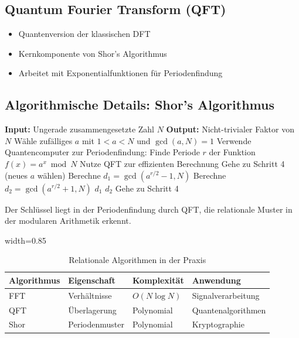 	\subsection{Quantum Fourier Transform (QFT)}
	
	\begin{itemize}
		\item Quantenversion der klassischen DFT
		\item Kernkomponente von Shor's Algorithmus
		\item Arbeitet mit Exponentialfunktionen für Periodenfindung
	\end{itemize}
	
	\subsection{Algorithmische Details: Shor's Algorithmus}
	
	\begin{algorithm}[H]
\scriptsize
		\caption{Shor's Algorithmus für Primfaktorisierung}
		\label{alg:shor}
		\begin{algorithmic}[1]
			\STATE \textbf{Input:} Ungerade zusammengesetzte Zahl $N$
			\STATE \textbf{Output:} Nicht-trivialer Faktor von $N$
			\STATE 
			\STATE Wähle zufälliges $a$ mit $1 < a < N$ und $\gcd(a,N) = 1$
			\STATE Verwende Quantencomputer zur Periodenfindung:
			\STATE \quad Finde Periode $r$ der Funktion $f(x) = a^x \bmod N$
			\STATE \quad Nutze QFT zur effizienten Berechnung
			\STATE Gehe zu Schritt 4 (neues $a$ wählen)
			\ENDIF
			\STATE Berechne $d_1 = \gcd(a^{r/2} - 1, N)$
			\STATE Berechne $d_2 = \gcd(a^{r/2} + 1, N)$
			\RETURN $d_1$
			\RETURN $d_2$
			\ELSE
			\STATE Gehe zu Schritt 4
			\ENDIF
		\end{algorithmic}
	\end{algorithm}
	
	Der Schlüssel liegt in der Periodenfindung durch QFT, die relationale Muster in der modularen Arithmetik erkennt.
	
	\begin{table}[htbp]
		\centering
		\begin{adjustbox}{width=0.85\textwidth}
			\begin{tabular}{llll}
				\toprule
				\textbf{Algorithmus} & \textbf{Eigenschaft} & \textbf{Komplexität} & \textbf{Anwendung} \\
				\midrule
				FFT & Verhältnisse & $O(N \log N)$ & Signalverarbeitung \\
				QFT & Überlagerung & Polynomial & Quantenalgorithmen \\
				Shor & Periodenmuster & Polynomial & Kryptographie \\
				\bottomrule
			\end{tabular}
		\end{adjustbox}
		\caption{Relationale Algorithmen in der Praxis}
		\label{tab:algorithmen}
	\end{table}
	
